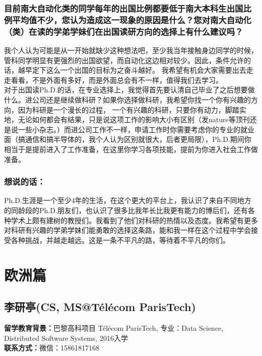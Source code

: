 \documentclass[a4paper,UTF8]{book}
\begin{document}
    \subsubsection*{目前南大自动化类的同学每年的出国比例都要低于南大本科生出国比例平均值不少，您认为造成这一现象的原因是什么？您对南大自动化（类）在读的学弟学妹们在出国读研方向的选择上有什么建议吗？}
    我个人认为可能是从一开始就缺少这种想法吧，至少我当年接触身边同学的时候，管科同学明显有更强烈的出国欲望，而自动化这边相对较少。因此，条件允许的话，越早定下这么一个出国的目标为之奋斗越好。 我希望有机会大家需要出去走走看看，不是外面有多好，而是外面总会有不一样，值得我们去学习。\\
    对于出国读Ph.D.的话，在专业选择上，我觉得首先要认清自己毕业了之后想要做什么。进公司还是继续做科研？如果你选择做科研，我希望你找一个你有兴趣的方向，因为科研是一个漫长的过程， 一个有兴趣的科研，只要你有动力，脚踏实地，无论如何都会有结果，只是说这项工作的影响大小有区别（发nature等顶刊还是说一些小杂志。）而进公司工作不一样，申请工作时你需要考虑你的专业的就业面（搞通信和搞半导体的，我个人认为区别就很大，后者更局限），Ph.D.期间你相当于是提前进入了工作准备，在这里你学习各项技能，提前为你进入社会工作做准备。
                    
    \subsubsection{想说的话：}
    Ph.D.生涯是一个至少4年的生活，在这个更大的平台上，我认识了来自不同地方的同龄段的Ph.D.朋友们，也认识了很多比我年长比我更有能力的博后们，还有各种学术上颇有建树的教授们。我看到了他们对科研的热情以及态度。我希望有更多对科研有兴趣的学弟学妹们能勇敢的选择这条路，能和我一样在这个过程中学会接受各种挑战，并越走越远。这是一条不平凡的路，等待着不平凡的你们。



\clearpage
\section{欧洲篇}

\subsection{李研亭(CS, MS@Télécom ParisTech)}
    \textbf{留学教育背景：}巴黎高科项目 Télécom ParisTech, 
    专业：Data Science, Distributed Software Systems, 
    2016入学\\
    \textbf{联系方式：}微信：15861817168
\end{document}
